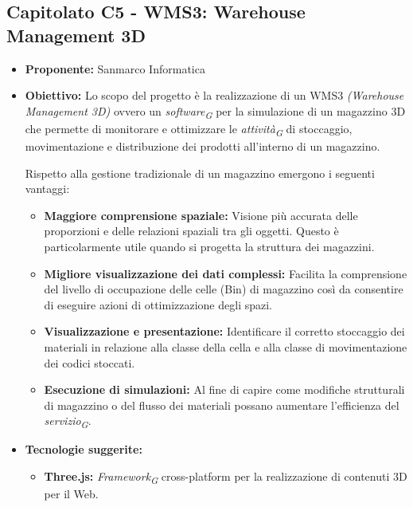\documentclass{article}
\begin{document}

\subsection{\textbf{Capitolato C5} - WMS3: Warehouse Management 3D}
\begin{itemize}
    \item[] \textbf{Proponente:} Sanmarco Informatica
        
    \item[] \textbf{Obiettivo:} Lo scopo del progetto è la realizzazione di un WMS3 \textit{(Warehouse Management 3D)} ovvero un \textit{software}\textsubscript{\textit{G}} per la simulazione di un magazzino 3D che permette di monitorare e ottimizzare le \textit{attività}\textsubscript{\textit{G}} di stoccaggio, movimentazione e distribuzione dei prodotti all'interno di un magazzino. 
    
    Rispetto alla gestione tradizionale di un magazzino emergono i seguenti vantaggi:
    \begin{itemize}
        \item \textbf{Maggiore comprensione spaziale:} Visione più accurata delle proporzioni e delle relazioni spaziali tra gli oggetti. Questo è particolarmente utile quando si progetta la struttura dei magazzini.
        \item \textbf{Migliore visualizzazione dei dati complessi:} Facilita la comprensione del livello di occupazione delle celle (Bin) di magazzino così da consentire di eseguire azioni di ottimizzazione degli spazi.
        \item \textbf{Visualizzazione e presentazione:} Identificare il corretto stoccaggio dei materiali in relazione alla classe della cella e alla classe di movimentazione dei codici stoccati. 
        \item \textbf{Esecuzione di simulazioni:} Al fine di capire come modifiche strutturali di magazzino o del flusso dei materiali possano aumentare l'efficienza del \textit{servizio}\textsubscript{\textit{G}}.
    \end{itemize}

    \item[] \textbf{Tecnologie suggerite:}
    \begin{itemize}
        \item \textbf{Three.js:} \textit{Framework}\textsubscript{\textit{G}} cross-platform per la realizzazione di contenuti 3D per il Web.
    \end {itemize}


\end{itemize}
\end{document}
